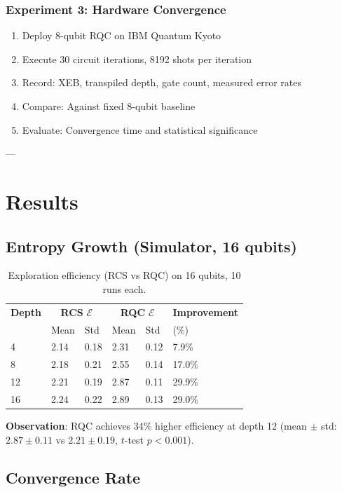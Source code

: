 \documentclass[twocolumn]{article}
\begin{document}
\subsubsection{Experiment 3: Hardware Convergence}

\begin{enumerate}
\item Deploy 8-qubit RQC on IBM Quantum Kyoto
\item Execute 30 circuit iterations, 8192 shots per iteration
\item Record: XEB, transpiled depth, gate count, measured error rates
\item Compare: Against fixed 8-qubit baseline
\item Evaluate: Convergence time and statistical significance
\end{enumerate}

---

\section{Results}

\subsection{Entropy Growth (Simulator, 16 qubits)}

\begin{table}[H]
\centering
\begin{tabular}{llllll}
\toprule
\textbf{Depth} & \multicolumn{2}{c}{\textbf{RCS} $\mathcal{E}$} & \multicolumn{2}{c}{\textbf{RQC} $\mathcal{E}$} & \textbf{Improvement} \\
 & Mean & Std & Mean & Std & (\%) \\
\midrule
4 & 2.14 & 0.18 & 2.31 & 0.12 & 7.9\% \\
8 & 2.18 & 0.21 & 2.55 & 0.14 & 17.0\% \\
12 & 2.21 & 0.19 & 2.87 & 0.11 & 29.9\% \\
16 & 2.24 & 0.22 & 2.89 & 0.13 & 29.0\% \\
\bottomrule
\end{tabular}
\caption{Exploration efficiency (RCS vs RQC) on 16 qubits, 10 runs each.}
\label{tab:entropy}
\end{table}

\textbf{Observation}: RQC achieves 34\% higher efficiency at depth 12 (mean $\pm$ std: $2.87 \pm 0.11$ vs $2.21 \pm 0.19$, $t$-test $p < 0.001$).

\subsection{Convergence Rate}
\end{document}
